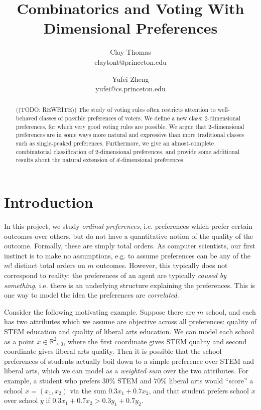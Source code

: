 \documentclass[12pt]{article}
\newcommand{\Rgz}{\mathbb{R}_{\ge 0}}
\newcommand{\1}[1]{\mathds{1}[{#1}]}
\begin{document}
 
\title{
  Combinatorics and Voting With Dimensional Preferences
}
\author{
  Clay Thomas \\
  claytont@princeton.edu
\and
  Yufei Zheng\\
  yufei@cs.princeton.edu
}

\maketitle
\begin{abstract}
  ((TODO: REWRITE))
  The study of voting rules often restricts attention to
  well-behaved classes of possible preferences of voters.
  We define a new class: $2$-dimensional preferences,
  for which very good voting rules are possible.
  We argue that $2$-dimensional preferences are in some ways
  more natural and expressive than more traditional classes
  such as single-peaked preferences.
  Furthermore, we give an almost-complete combinatorial classification
  of $2$-dimensional preferences, and provide some additional
  results about the natural extension of $d$-dimensional preferences.
\end{abstract}

\section{Introduction}

  In this project, we study \emph{ordinal preferences}, i.e. preferences which
  prefer certain outcomes over others, but do not have a quantitative notion of
  the quality of the outcome. Formally, these are simply total orders.
  As computer scientists, our first instinct is to make no assumptions,
  e.g. to assume preferences can be any of the $m!$ distinct total orders
  on $m$ outcomes.
  However, this typically does not correspond to reality: the preferences of an
  agent are typically \emph{caused by something}, i.e. there is an underlying
  structure explaining the preferences. This is one way to model the idea the
  preferences are \emph{correlated}.

  Consider the following motivating example.
  Suppose there are $m$ school, and each has two attributes
  which we assume are objective across all preferences:
  quality of STEM education and quality of liberal arts education.
  We can model each school as a point $x\in \Rgz^2$, where the first coordinate
  gives STEM quality and second coordinate gives liberal arts quality.
  Then it is possible that the school preferences of students
  actually boil down to a simple preference over STEM and liberal arts,
  which we can model as a \emph{weighted sum} over the two attributes.
  For example, a student who prefers $30\%$ STEM and $70\%$ liberal arts
  would ``score'' a school $x = (x_1, x_2)$ via the sum
  $0.3 x_1 + 0.7 x_2$, and that student prefers school $x$ over school $y$
  if $0.3 x_1 + 0.7 x_2 > 0.3 y_1 + 0.7 y_2$.
\end{document}
